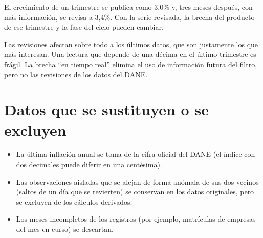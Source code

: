 \begin{dato}
El crecimiento de un trimestre se publica como 3,0\% y, tres meses después, con más información, se revisa a 3,4\%. Con
la serie revisada, la brecha del producto de ese trimestre y la fase del ciclo pueden cambiar.
\end{dato}

\begin{alerta}
Las revisiones afectan sobre todo a los últimos datos, que son justamente los que más interesan. Una lectura que depende
de una décima en el último trimestre es frágil. La brecha ``en tiempo real'' elimina el uso de información futura del
filtro, pero no las revisiones de los datos del DANE.
\end{alerta}

\section{Datos que se sustituyen o se excluyen}
\begin{itemize}
\item La última inflación anual se toma de la cifra oficial del DANE (el índice con dos decimales puede diferir en una
  centésima).
\item Las observaciones aisladas que se alejan de forma anómala de sus dos vecinos (saltos de un día que se revierten)
  se conservan en los datos originales, pero se excluyen de los cálculos derivados.
\item Los meses incompletos de los registros (por ejemplo, matrículas de empresas del mes en curso) se descartan.
\end{itemize}
